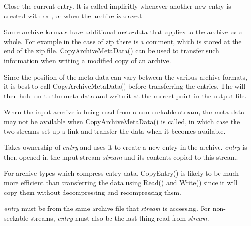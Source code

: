 
Close the current entry. It is called implicitly whenever another new
entry is created with 
or , or
when the archive is closed.


\label{wxarchiveoutputstreamcopyarchivemetadata}


Some archive formats have additional meta-data that applies to the archive
as a whole.  For example in the case of zip there is a comment, which
is stored at the end of the zip file.  CopyArchiveMetaData() can be used
to transfer such information when writing a modified copy of an archive.

Since the position of the meta-data can vary between the various archive
formats, it is best to call CopyArchiveMetaData() before transferring
the entries.  The 
will then hold on to the meta-data and write it at the correct point in
the output file.

When the input archive is being read from a non-seekable stream, the
meta-data may not be available when CopyArchiveMetaData() is called,
in which case the two streams set up a link and transfer the data
when it becomes available.


\label{wxarchiveoutputstreamcopyentry}


Takes ownership of {\it entry} and uses it to create a new entry in the
archive. {\it entry} is then opened in the input stream {\it stream}
and its contents copied to this stream.

For archive types which compress entry data, CopyEntry() is likely to be
much more efficient than transferring the data using Read() and Write()
since it will copy them without decompressing and recompressing them.

{\it entry} must be from the same archive file that {\it stream} is
accessing. For non-seekable streams, {\it entry} must also be the last
thing read from {\it stream}.


\label{wxarchiveoutputstreamputnextdirentry}

